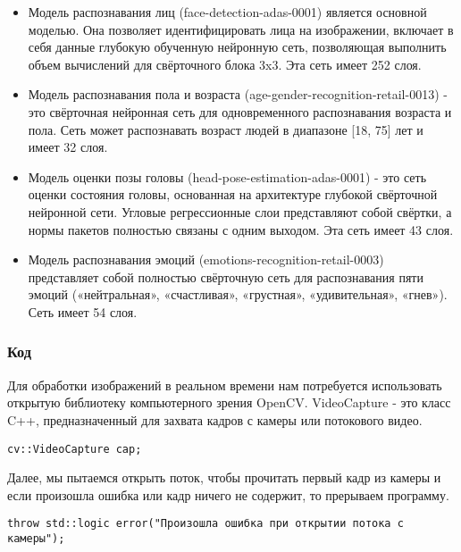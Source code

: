 \documentclass[14pt,a4paper]{scrartcl}
\begin{document}
			\begin{itemize}
				\item Модель распознавания лиц (face-detection-adas-0001) является основной моделью. Она позволяет идентифицировать лица на изображении, включает в себя данные глубокую обученную нейронную сеть, позволяющая выполнить объем вычислений для свёрточного блока 3x3. Эта сеть имеет 252 слоя\cite{bib:Face_Detect_Desc}.
				\item Модель распознавания пола и возраста (age-gender-recognition-retail-0013) - это свёрточная нейронная сеть для одновременного распознавания возраста и пола. Сеть может распознавать возраст людей в диапазоне [18, 75] лет и имеет 32 слоя\cite{bib:Age_Gender_Desc}.
				\item Модель оценки позы головы (head-pose-estimation-adas-0001) - это сеть оценки состояния головы, основанная на архитектуре глубокой свёрточной нейронной сети. Угловые регрессионные слои представляют собой свёртки, а нормы пакетов полностью связаны с одним выходом. Эта сеть имеет 43 слоя\cite{bib:Head_Pose_Desc}.
				\item Модель распознавания эмоций (emotions-recognition-retail-0003) представляет собой полностью свёрточную сеть для распознавания пяти эмоций («нейтральная», «счастливая», «грустная», «удивительная», «гнев»). Сеть имеет 54 слоя\cite{bib:Emotion_Recog_Desc}.
			\end{itemize}
		
		\subsubsection{Код}
		
			Для обработки изображений в реальном времени нам потребуется использовать открытую библиотеку компьютерного зрения OpenCV. VideoCapture - это
			класс C++, предназначенный для захвата кадров с камеры или потокового видео\cite{bib:CV_Video_Capture}.
			
			\begin{verbatim}
cv::VideoCapture cap;
			\end{verbatim}
			
			Далее, мы пытаемся открыть поток, чтобы прочитать первый кадр из камеры и если произошла ошибка или кадр ничего не содержит, то прерываем программу.
			
			\begin{verbatim}
throw std::logic error("Произошла ошибка при открытии потока с камеры");
			\end{verbatim}
			
\end{document}
